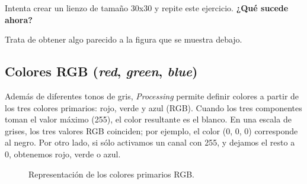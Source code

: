 \documentclass[
  spanish,
  11pt,
  a4paper,
  DIV=11,
  numbers=noendperiod]{scrartcl}
\begin{document}
Intenta crear un lienzo de tamaño 30x30 y repite este ejercicio. \textbf{¿Qué sucede ahora?}

\begin{tcolorbox}[enhanced jigsaw, toprule=.15mm, coltitle=black, titlerule=0mm, opacitybacktitle=0.6, breakable, colback=white, colframe=quarto-callout-note-color-frame, colbacktitle=quarto-callout-note-color!10!white, opacityback=0, title={Ejercicio 8 - Dibuja una forma geométrica}, bottomtitle=1mm, rightrule=.15mm, toptitle=1mm, left=2mm, bottomrule=.15mm, leftrule=.75mm, arc=.35mm]

Trata de obtener algo parecido a la figura que se muestra debajo.


\end{tcolorbox}

\subsection{\texorpdfstring{Colores RGB (\emph{red}, \emph{green}, \emph{blue})}{Colores RGB (red, green, blue)}}

\label{colores-rgb-red-green-blue}

Además de diferentes tonos de gris, \emph{Processing} permite definir colores a partir de los tres colores primarios: rojo, verde y azul (RGB). Cuando los tres componentes toman el valor máximo (255), el color resultante es el blanco. En una escala de grises, los tres valores RGB coinciden; por ejemplo, el color (0, 0, 0) corresponde al negro. Por otro lado, si sólo activamos un canal con 255, y dejamos el resto a 0, obtenemos rojo, verde o azul.

\begin{figure}

\caption{\label{fig-rgb}Representación de los colores primarios RGB.}

\end{figure}%

\end{document}
